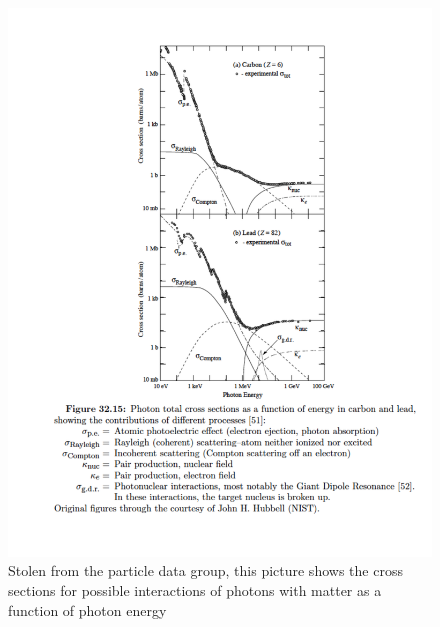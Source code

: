 \begin{figure}[h]
\centering\includegraphics[scale=0.5]{./particleinteractions/Pictures/photoninteractions.pdf}
\caption{Stolen from the particle data group, this picture shows the cross sections for possible interactions of photons with matter as a function of photon energy }
\label{fig:photoninteractions}
\end{figure}

